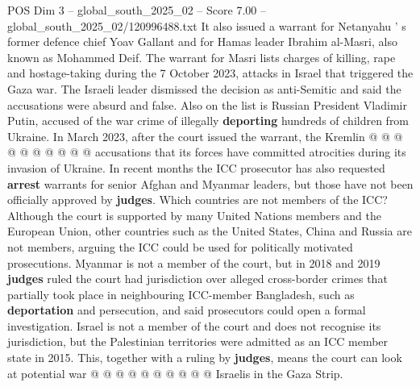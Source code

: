 \begin{textsample}{POS Dim 3 – global\_south\_2025\_02 – Score 7.00 – global\_south\_2025\_02/120996488.txt}
It also issued a warrant for Netanyahu ' s former defence chief Yoav Gallant and for Hamas leader Ibrahim al-Masri, also known as Mohammed Deif.
The warrant for Masri lists charges of killing, rape and hostage-taking during the 7 October 2023, attacks in Israel that triggered the Gaza war.
The Israeli leader dismissed the decision as anti-Semitic and said the accusations were absurd and false.
Also on the list is Russian President Vladimir Putin, accused of the war crime of illegally \textbf{deporting} hundreds of children from Ukraine.
In March 2023, after the court issued the warrant, the Kremlin @ @ @ @ @ @ @ @ @ @ accusations that its forces have committed atrocities during its invasion of Ukraine.
In recent months the ICC prosecutor has also requested \textbf{arrest} warrants for senior Afghan and Myanmar leaders, but those have not been officially approved by \textbf{judges}.
Which countries are not members of the ICC?
Although the court is supported by many United Nations members and the European Union, other countries such as the United States, China and Russia are not members, arguing the ICC could be used for politically motivated prosecutions.
Myanmar is not a member of the court, but in 2018 and 2019 \textbf{judges} ruled the court had jurisdiction over alleged cross-border crimes that partially took place in neighbouring ICC-member Bangladesh, such as \textbf{deportation} and persecution, and said prosecutors could open a formal investigation.
Israel is not a member of the court and does not recognise its jurisdiction, but the Palestinian territories were admitted as an ICC member state in 2015.
This, together with a ruling by \textbf{judges}, means the court can look at potential war @ @ @ @ @ @ @ @ @ @ Israelis in the Gaza Strip.

\end{textsample}

